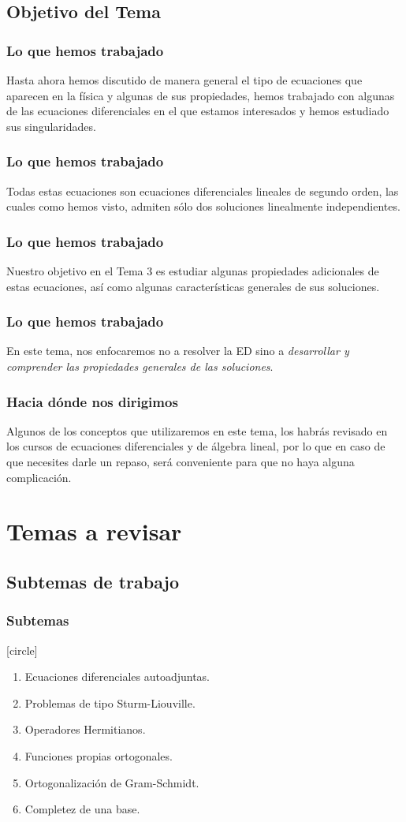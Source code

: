 \subsection{Objetivo del Tema}
\begin{frame}
\frametitle{Lo que hemos trabajado}
Hasta ahora hemos discutido de manera general el tipo de ecuaciones que aparecen en la física y algunas de sus propiedades, hemos trabajado con algunas de las ecuaciones diferenciales en el que estamos interesados y hemos estudiado sus singularidades.
\end{frame}
\begin{frame}
\frametitle{Lo que hemos trabajado}
Todas estas ecuaciones son ecuaciones diferenciales lineales de segundo orden, las cuales como hemos visto, admiten sólo dos soluciones linealmente independientes.
\end{frame}
\begin{frame}
\frametitle{Lo que hemos trabajado}
Nuestro objetivo en el Tema 3 es estudiar algunas propiedades adicionales de estas ecuaciones, así como algunas características generales de sus soluciones. 
\end{frame}
\begin{frame}
\frametitle{Lo que hemos trabajado}
En este tema, nos enfocaremos no a resolver la ED sino a \emph{desarrollar y comprender las propiedades generales de las soluciones}.
\end{frame}
\begin{frame}
\frametitle{Hacia dónde nos dirigimos}
Algunos de los conceptos que utilizaremos en este tema, los habrás revisado en los cursos de ecuaciones diferenciales y de álgebra lineal, por lo que en caso de que necesites darle un repaso, será conveniente para que no haya alguna complicación.
\end{frame}
\section{Temas a revisar}
\subsection{Subtemas de trabajo}
\begin{frame}
\frametitle{Subtemas}
[circle]
\begin{enumerate}[<+->]
\item Ecuaciones diferenciales autoadjuntas.
\item Problemas de tipo Sturm-Liouville.
\item Operadores Hermitianos.
\item Funciones propias ortogonales.
\item Ortogonalización de Gram-Schmidt.
\item Completez de una base.
\end{enumerate}
\end{frame}
